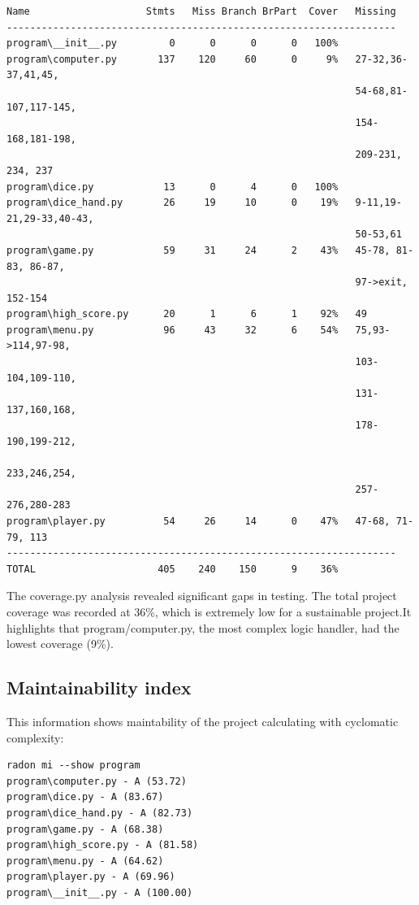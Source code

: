 \documentclass{article}
\begin{document}
\begin{verbatim}
Name                    Stmts   Miss Branch BrPart  Cover   Missing
-------------------------------------------------------------------
program\__init__.py         0      0      0      0   100%
program\computer.py       137    120     60      0     9%   27-32,36-37,41,45,
                                                            54-68,81-107,117-145,
                                                            154-168,181-198, 
                                                            209-231, 234, 237
program\dice.py            13      0      4      0   100%
program\dice_hand.py       26     19     10      0    19%   9-11,19-21,29-33,40-43,
                                                            50-53,61
program\game.py            59     31     24      2    43%   45-78, 81-83, 86-87,
                                                            97->exit, 152-154
program\high_score.py      20      1      6      1    92%   49
program\menu.py            96     43     32      6    54%   75,93->114,97-98,
                                                            103-104,109-110,
                                                            131-137,160,168,
                                                            178-190,199-212,
                                                            233,246,254,
                                                            257-276,280-283
program\player.py          54     26     14      0    47%   47-68, 71-79, 113
-------------------------------------------------------------------
TOTAL                     405    240    150      9    36%
\end{verbatim}

The coverage.py analysis revealed significant gaps in testing. The total project coverage was recorded at 36\%, which is extremely low for a sustainable project.It highlights that program/computer.py, the most complex logic handler, had the
lowest coverage (9\%).

\subsection{Maintainability index}
This information shows maintability of the project calculating with cyclomatic complexity:

\begin{verbatim}
radon mi --show program
program\computer.py - A (53.72)
program\dice.py - A (83.67)
program\dice_hand.py - A (82.73)
program\game.py - A (68.38)
program\high_score.py - A (81.58)
program\menu.py - A (64.62)
program\player.py - A (69.96)
program\__init__.py - A (100.00)\end{verbatim}
\end{document}
